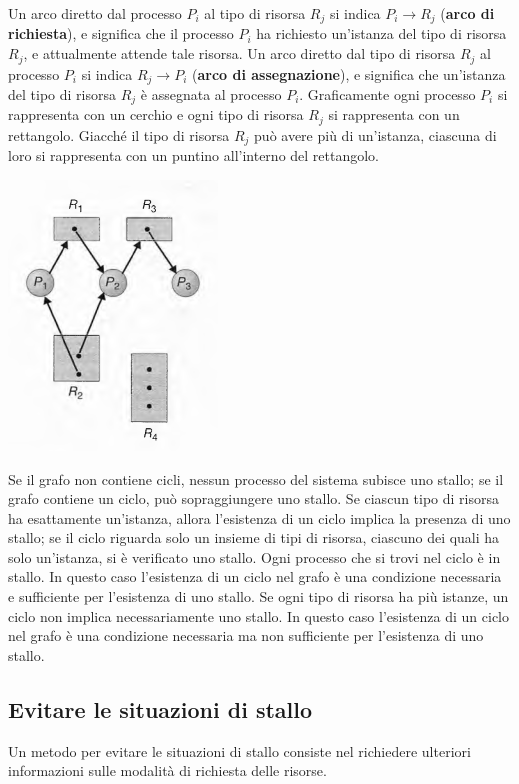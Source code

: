 \documentclass[11pt,a4paper]{article}
\begin{document}
Un arco diretto dal processo $P_i$ al tipo di risorsa $R_j$ si indica $P_i\rightarrow R_j$ (\textbf{arco di richiesta}), e significa che il
processo $P_i$ ha richiesto un'istanza del tipo di risorsa $R_j$, e attualmente attende tale risorsa.
Un arco diretto dal tipo di risorsa $R_j$ al processo $P_i$ si indica $R_j\rightarrow P_i$ (\textbf{arco di assegnazione}), e significa che un'istan­za del tipo di risorsa $R_j$ è assegnata al processo $P_i$.
Graficamente ogni processo $P_i$ si rappresenta con un cerchio e ogni tipo di risorsa $R_j$ si
rappresenta con un rettangolo. Giacché il tipo di risorsa $R_j$ può avere più di un'istanza, cia­scuna di loro si rappresenta con un puntino all'interno del rettangolo.
\begin{center}
  \includegraphics[scale=0.6]{img/0036.png}
\end{center}
Se il grafo
non contiene cicli, nessun processo del sistema subisce uno stallo; se il grafo contiene un ci­clo, può sopraggiungere uno stallo.
Se ciascun tipo di risorsa ha esattamente un'istanza, allora l'esistenza di un ciclo impli­ca la presenza di uno stallo; se il ciclo riguarda solo un insieme di tipi di risorsa, ciascuno dei
quali ha solo un'istanza, si è verificato uno stallo. Ogni processo che si trovi nel ciclo è in
stallo. In questo caso l'esistenza di un ciclo nel grafo è una condizione necessaria e sufficien­te per l'esistenza di uno stallo.
Se ogni tipo di risorsa ha più istanze, un ciclo non implica necessariamente uno stallo.
In questo caso l'esistenza di un ciclo nel grafo è una condizione necessaria ma non sufficien­te per l'esistenza di uno stallo.

\subsection{Evitare le situazioni di stallo}
Un metodo per evitare le situazioni di stallo consiste nel richiedere ulterio­ri informazioni sulle modalità di richiesta delle risorse.
\end{document}
